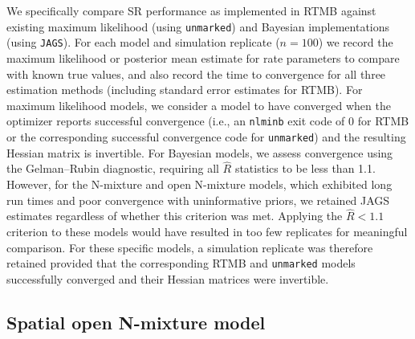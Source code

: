 \documentclass[11pt]{article}
\begin{document}
We specifically compare SR performance as implemented in RTMB against existing maximum likelihood (using \texttt{unmarked}) and Bayesian implementations (using \texttt{JAGS}). For each model and simulation replicate ($n = 100$) we record the maximum likelihood or posterior mean estimate for rate parameters to compare with known true values, and also record the time to convergence for all three estimation methods (including standard error estimates for RTMB). For maximum likelihood models, we consider a model to have converged when the optimizer reports successful convergence (i.e., an \texttt{nlminb} exit code of 0 for RTMB or the corresponding successful convergence code for \texttt{unmarked}) and the resulting Hessian matrix is invertible. For Bayesian models, we assess convergence using the Gelman--Rubin diagnostic, requiring all $\hat{R}$ statistics to be less than 1.1. However, for the N-mixture and open N-mixture models, which exhibited long run times and poor convergence with uninformative priors, we retained JAGS estimates regardless of whether this criterion was met. Applying the $\hat{R} < 1.1$ criterion to these models would have resulted in too few replicates for meaningful comparison. For these specific models, a simulation replicate was therefore retained provided that the corresponding RTMB and \texttt{unmarked} models successfully converged and their Hessian matrices were invertible.

\subsection{Spatial open N-mixture model}
\end{document}
